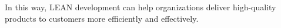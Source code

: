 In this way, LEAN development can help organizations deliver high-quality products to customers more efficiently and effectively.
\clearpage





